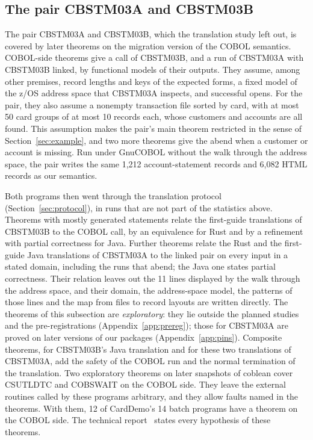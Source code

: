 \subsection{The pair CBSTM03A and CBSTM03B}
\label{sec:cbstm03}

The pair CBSTM03A and CBSTM03B, which the translation study left out, is covered by later theorems on the migration version of the COBOL semantics. COBOL-side theorems give a call of CBSTM03B, and a run of CBSTM03A with
CBSTM03B linked, by functional models of their outputs. They assume, among other premises, record lengths and keys of the expected forms, a
fixed model of the z/OS address space that CBSTM03A inspects, and successful opens. For the pair, they also assume a
nonempty transaction file sorted by card, with at most 50 card groups of at most 10 records each, whose customers and accounts are all found. This assumption makes the pair's main theorem restricted in the sense of Section~\ref{sec:example}, and
two more theorems give the abend when a customer or account is missing. Run under GnuCOBOL without the walk through
the address space, the pair writes the same 1,212 account-statement records and 6,082 HTML records as our semantics.

Both programs then went through the translation protocol (Section~\ref{sec:protocol}), in runs that are not part of the statistics
above. Theorems with mostly generated statements relate the first-guide translations of CBSTM03B to the COBOL call, by
an equivalence for Rust and by a refinement with partial correctness for Java. Further theorems relate the Rust and the first-guide Java translations of CBSTM03A to the linked pair on every
input in a stated domain, including the runs that abend; the Java one states partial correctness. Their relation leaves out the 11 lines displayed by the walk through the address space, and their domain, the address-space model, the
patterns of those lines and the map from files to record layouts are written directly. The theorems of this subsection are \emph{exploratory}: they lie outside the planned studies and the pre-registrations
(Appendix~\ref{app:prereg}); those for CBSTM03A are proved on later versions of our packages
(Appendix~\ref{app:pins}).
Composite theorems, for CBSTM03B's Java translation and for these two translations of CBSTM03A, add the safety of the COBOL
run and the normal termination of the translation. Two exploratory theorems on later snapshots of coblean cover CSUTLDTC and COBSWAIT on the COBOL side. They leave the external routines called by these programs arbitrary, and they
allow faults named in the theorems. With them, 12 of CardDemo's 14 batch programs have a theorem on the COBOL side. The
technical report~\cite{fvtechreport} states every hypothesis of these theorems.


